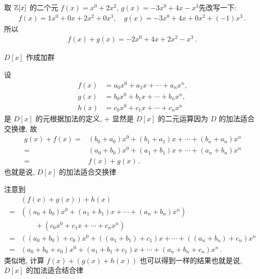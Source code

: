 \begin{example}
    取 $\mathbb{Z}[x]$ 的二个元 $f(x)=x^0 + 2x^2$, $g(x)=-3x^0 + 4x - x^3$\period 先改写一下:
    \begin{align*}
        f(x) = 1x^0 + 0x + 2x^2 + 0x^3, \quad g(x) = -3x^0 + 4x + 0x^2 + (-1)x^3 \period
    \end{align*}
    所以
    \begin{align*}
        f(x) + g(x) = -2x^0 + 4x + 2x^2 - x^3 \period
    \end{align*}
\end{example}

\begin{proposition}
    $D[x]$ 作成加群\period
\end{proposition}

\begin{pf}
    设
    \begin{align*}
        f(x) & = a_0 x^0 + a_1 x + \cdots + a_n x^n, \\
        g(x) & = b_0 x^0 + b_1 x + \cdots + b_n x^n, \\
        h(x) & = c_0 x^0 + c_1 x + \cdots + c_n x^n
    \end{align*}
    是 $D[x]$ 的元\period 根据加法的定义, $+$ 显然是 $D[x]$ 的二元运算\period 因为 $D$ 的加法适合交换律, 故
    \begin{align*}
        g(x) + f(x)
        = {} & (b_0 + a_0) x^0 + (b_1 + a_1) x + \cdots + (b_n + a_n) x^n \\
        = {} & (a_0 + b_0) x^0 + (a_1 + b_1) x + \cdots + (a_n + b_n) x^n \\
        = {} & f(x) + g(x) \period
    \end{align*}
    也就是说, $D[x]$ 的加法适合交换律\period

    注意到
    \begin{align*}
             & (f(x) + g(x)) + h(x)                                                                 \\
        = {} & ((a_0 + b_0) x^0 + (a_1 + b_1) x + \cdots + (a_n + b_n) x^n)                         \\
             & \qquad + (c_0 x^0 + c_1 x + \cdots + c_n x^n)                                        \\
        = {} & ((a_0 + b_0) + c_0) x^0 + ((a_1 + b_1) + c_1) x + \cdots + ((a_n + b_n) + c_n) x^n   \\
        = {} & (a_0 + b_0 + c_0) x^0 + (a_1 + b_1 + c_1) x + \cdots + (a_n + b_n + c_n) x^n \period
    \end{align*}
    类似地, 计算 $f(x) + (g(x) + h(x))$ 也可以得到一样的结果\period 也就是说, $D[x]$ 的加法适合结合律\period


\end{pf}
